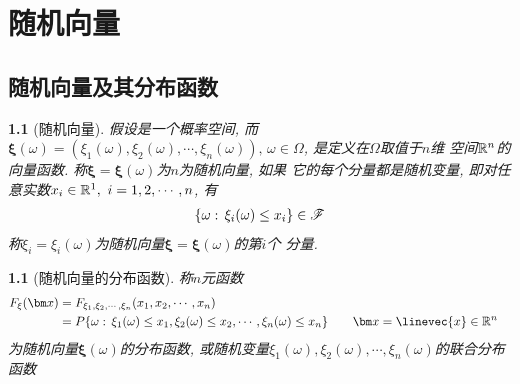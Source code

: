 \chapter{随机向量}

\makeatletter
\def\random@vector#1{\bm{#1}(\omega) = (#1_1(\omega), #1_2(\omega),\cdots, #1_n(\omega))}
\def\rvxi{\random@vector{\xi}}
\makeatother

\section{随机向量及其分布函数}

\newtheorem{random_vector_def}[theorem_root]{}
\begin{random_vector_def}[随机向量]
\label{def:random-vector-def}
假设\prbsp 是一个概率空间, 而\(\rvxi,\,\omega\in\Omega\), 是定义在\(\Omega\)取值于\(n\)维
空间\(\Rs^n\)的向量函数. 称\(\bm\xi = \bm\xi(\omega)\)为\(n\)为随机向量, 如果
它的每个分量都是随机变量, 即对任意实数\(x_i\in\Rs^1,\,\,i=1, 2,\cdots, n\), 有
\begin{align}
    \{\omega:\,\xi_{i}(\omega)\le x_i\}\in\msF
\end{align}
称\(\xi_i = \xi_i(\omega)\)为随机向量\(\bm\xi = \bm\xi(\omega)\)的第\(i\)个
分量.
\end{random_vector_def}

\newtheorem{distribution_function_of_random_vector}[theorem_root]{}
\begin{distribution_function_of_random_vector}[随机向量的分布函数]
称\(n\)元函数
\begin{align}
    F_\xi(\bm x) &= F_{\xi_1, \xi_2,\cdots, \xi_n}(x_1, x_2,\cdots,x_n)\cr
    &= P\{\omega:\,\xi_1(\omega)\le x_1,\xi_2(\omega)\le x_2,\cdots,\xi_n(\omega)\le x_n\}\qquad \bm x = \linevec{x}\in\Rs^n
\end{align}
为随机向量\(\bm\xi(\omega)\)的分布函数, 或随机变量\(\xi_1(\omega), \xi_2(\omega),\cdots, \xi_n(\omega)\)的联合分布函数
\end{distribution_function_of_random_vector}

